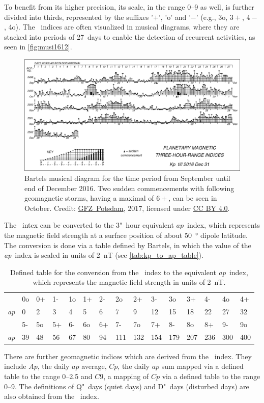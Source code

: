 To benefit from its higher precision, its scale, in the range 0--9 as well, is further divided into thirds, represented by the suffixes '$+$', 'o' and '$-$' (e.g., 3o, $3+$, $4-$, 4o). The \Kp{}~indices are often visualized in musical diagrams, where they are stacked into periods of 27~days to enable the detection of recurrent activities, as seen in \autoref{fig:musi1612}.
\begin{figure}[htb]
	\centering
	\includegraphics[width=\textwidth]{images/musi1612.pdf}
	\caption{Bartels musical \Kp{} diagram for the time period from September until end of December 2016. Two sudden commencements with following geomagnetic storms, having a maximal \Kp{} of $6+$, can be seen in October. Credit: \href{http://www.gfz-potsdam.de/en/kp-index/}{GFZ~Potsdam}, 2017, licensed under \href{https://creativecommons.org/licenses/by/4.0/}{CC BY 4.0}.}
	\label{fig:musi1612}
\end{figure}

The \Kp{}~intex can be converted to the 3"~hour equivalent $ap$~index, which represents the magnetic field strength at a surface position of about \SI{50}{\degree} dipole latitude. The conversion is done via a table defined by Bartels, in which the value of the \textit{ap}~index is scaled in units of \SI{2}{nT} (see \autoref{tab:kp_to_ap_table}).
\begin{table}
	\caption{Defined table for the conversion from the \Kp~index to the equivalent \textit{ap}~index, which represents the magnetic field strength in units of \SI{2}{nT}.}
	\label{tab:kp_to_ap_table}
	\centering
	\begin{tabular}{lssssssssssssss}
		\Kp	&0o	&0+	&1-	&1o	&1+	&2-	&2o	&2+	&3-	&3o	&3+	&4-	&4o	&4+\\
		\textit{ap}	&0	&2	&3	&4	&5	&6	&7	&9	&12	&15	&18	&22	&27	&32\\
		\hline
		\Kp	&5-	&5o	&5+	&6-	&6o	&6+	&7-	&7o	&7+	&8-	&8o	&8+	&9-	&9o\\
		\textit{ap}	&39	&48	&56	&67	&80	&94	&111	&132	&154	&179	&207	&236	&300	&400
	\end{tabular}
\end{table}
There are further geomagnetic indices which are derived from the \Kp{}~index. They include $Ap$, the daily $ap$ average, $Cp$, the daily $ap$ sum mapped via a defined table to the range \numrange{0}{2.5} and $C9$, a mapping of $Cp$ via a defined table to the range \numrange{0}{9}. The definitions of Q"~days (quiet days) and D"~days (disturbed days) are also obtained from the \Kp{}~index.

